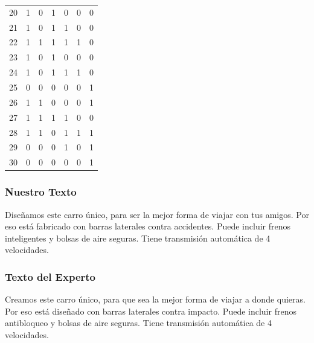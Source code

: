 \begin{table}
\begin{tabular}{|r|c|c|c|c|c|c|}
20 &         1 &         0 &         1 &         0 &         0 &         0 \\
21 &         1 &         0 &         1 &         1 &         0 &         0 \\
22 &         1 &         1 &         1 &         1 &         1 &         0 \\
23 &         1 &         0 &         1 &         0 &         0 &         0 \\
24 &         1 &         0 &         1 &         1 &         1 &         0 \\
25 &         0 &         0 &         0 &         0 &         0 &         1 \\
26 &         1 &         1 &         0 &         0 &         0 &         1 \\
27 &         1 &         1 &         1 &         1 &         0 &         0 \\
28 &         1 &         1 &         0 &         1 &         1 &         1 \\
29 &         0 &         0 &         0 &         1 &         0 &         1 \\
30 &         0 &         0 &         0 &         0 &         0 &         1 

\end{tabular}
\end{table}


\subsubsection{Nuestro Texto}

Diseñamos este carro único, para ser la mejor forma de viajar con tus amigos. Por eso está fabricado con barras laterales contra accidentes. Puede incluir frenos inteligentes y bolsas de aire seguras. Tiene transmisión automática de 4 velocidades.

\subsubsection{Texto del Experto}

Creamos este carro único, para que sea la mejor forma de viajar a donde quieras. Por eso está diseñado con barras laterales contra impacto. Puede incluir frenos antibloqueo y bolsas de aire seguras. Tiene transmisión automática de 4 velocidades.

